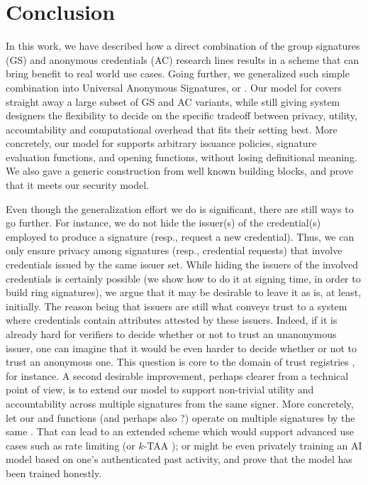 \section{Conclusion}
\label{sec:conclusion}

In this work, we have described how a direct combination of the group signatures
(GS) and anonymous credentials (AC) research lines results in a scheme that can
bring benefit to real world use cases. Going further, we generalized such simple
combination into Universal Anonymous Signatures, or \UAS. Our model for \UAS
covers straight away a large subset of GS and AC variants, while still giving
system designers the flexibility to decide on the specific tradeoff between
privacy, utility, accountability and computational overhead that fits their
setting best. More concretely, our model for \UAS supports arbitrary issuance
policies, signature evaluation functions, and opening functions, without losing
definitional meaning. We also gave a generic construction from well known
building blocks, and prove that it meets our security model.

Even though the generalization effort we do is significant, there are still
ways to go further.
%
For instance, we do not hide the issuer(s) of the
credential(s) employed to produce a signature (resp., request a new credential).
Thus, we can only ensure privacy among signatures (resp., credential requests)
that involve credentials issued by the same issuer set. While hiding the issuers
of the involved credentials is certainly possible (we show how to do it at
signing time, in order to build ring signatures), we argue that it may be
desirable to leave it as is, at least, initially. The reason being that issuers
are still what conveys trust to a system where credentials contain attributes
attested by these issuers. Indeed, if it is already hard for verifiers to decide
whether or not to trust an unanonymous issuer, one can imagine that it would be
even harder to decide whether or not to trust an anonymous one. This question
is core to the domain of trust registries \needcite, for instance.
%
A second desirable improvement, perhaps clearer from a technical point of view,
is to extend our model to support non-trivial utility and accountability across
multiple signatures from the same signer. More concretely, let our \feval and
\finsp functions (and perhaps also \fissue?) operate on multiple signatures by
the same \usk. That can lead to an extended \UAS scheme which would support
advanced use cases such as rate limiting (or $k$-TAA \cite{asm06}); or might
be even privately training an AI model based on one's authenticated
past activity, and prove that the model has been trained honestly.

